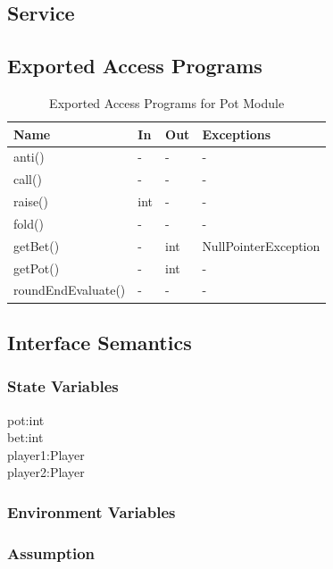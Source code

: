 \documentclass[11pt]{article}
\begin{document}
    \subsection{Service}
    \subsection{Exported Access Programs}
    \begin{table}[h]
    \caption{Exported Access Programs for Pot Module}
    \begin{tabular}{p{4cm}p{2cm}p{2cm}p{4cm}}
    Name & In & Out & Exceptions\\
    \hline
    anti() & - & - & -\\
    \hline
    call() & - & - & -\\
    \hline
    raise() & int & - & -\\
    \hline
    fold() & - & - & - \\
    \hline
    getBet() & - & int & NullPointerException\\
    \hline
    getPot() & - & int & -\\
    \hline
    roundEndEvaluate() & - & - & - \\
    \hline
    \end{tabular}
    \end{table}
    \subsection{Interface Semantics}
    \subsubsection{State Variables}
    pot:int\\
    bet:int\\
    player1:Player\\
    player2:Player
    \subsubsection{Environment Variables}
    \subsubsection{Assumption}
\end{document}
